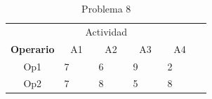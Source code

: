 \documentclass[12pt]{article}  %
\begin{document}
\begin{table}[H]
\centering
\caption{Problema 8}
\label{tab:Prob8}
\begin{tabular}{ccllcllcllclll}
\multicolumn{14}{c}{Actividad}                                                                                                                                                                                                                                                                                                                                                                                                                                                                                                                                                                                                                                        \\ \cline{2-13}
\multicolumn{1}{c|}{\textbf{Operario}} & \multicolumn{3}{c|}{A1}                                                                                                                        & \multicolumn{3}{c|}{A2}                                                                                                                        & \multicolumn{3}{c|}{A3}                                                                                                                        & \multicolumn{3}{c|}{A4}                                                                                                                        &                          \\ \cline{2-13}
\multicolumn{1}{c|}{Op1}               & \multicolumn{1}{c|}{\cellcolor[HTML]{67FD9A}7} & \multicolumn{1}{l|}{\cellcolor[HTML]{FFCC67}} & \multicolumn{1}{l|}{\cellcolor[HTML]{FCFF2F}} & \multicolumn{1}{c|}{\cellcolor[HTML]{67FD9A}6} & \multicolumn{1}{l|}{\cellcolor[HTML]{FFCC67}} & \multicolumn{1}{l|}{\cellcolor[HTML]{F8FF00}} & \multicolumn{1}{c|}{\cellcolor[HTML]{67FD9A}9} & \multicolumn{1}{l|}{\cellcolor[HTML]{FFCC67}} & \multicolumn{1}{l|}{\cellcolor[HTML]{F8FF00}} & \multicolumn{1}{c|}{\cellcolor[HTML]{67FD9A}2} & \multicolumn{1}{l|}{\cellcolor[HTML]{FFC702}} & \multicolumn{1}{l|}{\cellcolor[HTML]{F8FF00}} & \cellcolor[HTML]{FFCCC9} \\ \cline{2-13}
\multicolumn{1}{c|}{Op2}               & \multicolumn{1}{c|}{\cellcolor[HTML]{67FD9A}7} & \multicolumn{1}{l|}{\cellcolor[HTML]{FFCC67}} & \multicolumn{1}{l|}{\cellcolor[HTML]{FCFF2F}} & \multicolumn{1}{c|}{\cellcolor[HTML]{67FD9A}8} & \multicolumn{1}{l|}{\cellcolor[HTML]{FFCC67}} & \multicolumn{1}{l|}{\cellcolor[HTML]{F8FF00}} & \multicolumn{1}{c|}{\cellcolor[HTML]{67FD9A}5} & \multicolumn{1}{l|}{\cellcolor[HTML]{FFCC67}} & \multicolumn{1}{l|}{\cellcolor[HTML]{F8FF00}} & \multicolumn{1}{c|}{\cellcolor[HTML]{67FD9A}8} & \multicolumn{1}{l|}{\cellcolor[HTML]{FFC702}} & \multicolumn{1}{l|}{\cellcolor[HTML]{F8FF00}} & \cellcolor[HTML]{FFCCC9} \\ \cline{2-13}

\end{tabular}
\end{table}
\end{document}

